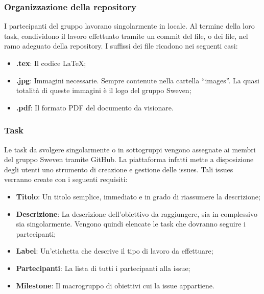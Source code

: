 \subsubsection{Organizzazione della repository}
I partecipanti del gruppo lavorano singolarmente in locale. Al termine della loro task, condividono 
il lavoro effettuato tramite un commit del file, o dei file, nel ramo adeguato della repository.
I suffissi dei file ricadono nei seguenti casi:
\begin{itemize}
    \item \textbf{.tex}: Il codice \LaTeX;
    \item \textbf{.jpg}: Immagini necessarie. Sempre contenute nella cartella ``images''. La quasi totalità 
                            di queste immagini è il logo del gruppo Sweven;
    \item \textbf{.pdf}: Il formato PDF del documento da visionare.
\end{itemize}
\subsubsection{Task}
Le task da svolgere singolarmente o in sottogruppi vengono assegnate ai membri del gruppo Sweven tramite
GitHub. La piattaforma infatti mette a disposizione degli utenti uno strumento di creazione e gestione delle 
issues. Tali issues verranno create con i seguenti requisiti:
\begin{itemize}
    \item \textbf{Titolo}: Un titolo semplice, immediato e in grado di riassumere la descrizione;
    \item \textbf{Descrizione}: La descrizione dell'obiettivo da raggiungere, sia in complessivo sia singolarmente. 
                                Vengono quindi elencate le task che dovranno seguire i partecipanti;
    \item \textbf{Label}: Un'etichetta che descrive il tipo di lavoro da effettuare;
    \item \textbf{Partecipanti}: La lista di tutti i partecipanti alla issue;
    \item \textbf{Milestone}: Il macrogruppo di obiettivi cui la issue appartiene.
\end{itemize}